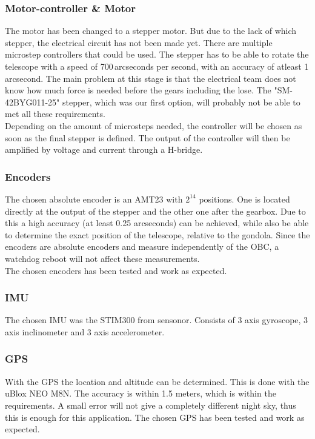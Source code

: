 \subsubsection{Motor-controller \& Motor}
{The motor has been changed to a stepper motor. But due to the lack of which stepper, the electrical circuit has not been made yet. There are multiple microstep controllers that could be used. The stepper has to be able to rotate the telescope with a speed of 700\,arcseconds per second, with an accuracy of atleast 1 arcsecond. The main problem at this stage is that the electrical team does not know how much force is needed before the gears including the lose. The "SM-42BYG011-25" stepper, which was our first option, will probably not be able to met all these requirements.\\

Depending on the amount of microsteps needed, the controller will be chosen as soon as the final stepper is defined. The output of the controller will then be amplified by voltage and current through a H-bridge.

\subsubsection{Encoders}
The chosen absolute encoder is an AMT23 with $2^{14}$ positions. One is located directly at the output of the stepper and the other one after the gearbox. Due to this a high accuracy (at least 0.25 arcseconds) can be achieved, while also be able to determine the exact position of the telescope, relative to the gondola. Since the encoders are absolute encoders and measure independently of the OBC, a watchdog reboot will not affect these measurements.\\

The chosen encoders has been tested and work as expected.


\subsubsection{IMU}
The chosen IMU was the STIM300 from sensonor. Consists of 3 axis gyroscope, 3 axis inclinometer and 3 axis accelerometer.

\subsubsection{GPS}
With the GPS the location and altitude can be determined. This is done with the uBlox NEO M8N. The accuracy is within 1.5 meters, which is within the requirements. A small error will not give a completely different night sky, thus this is enough for this application. The chosen GPS has been tested and work as expected.

}
